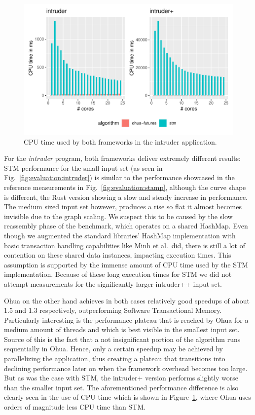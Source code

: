 \begin{figure}
    \centering
    \includegraphics[width=.66\textwidth,keepaspectratio]{gfx/results/cpu_intruder_comb}
    \caption{CPU time used by both frameworks in the intruder application.}%
    \label{fig:evaluation:intruder-cpu}
\end{figure}

For the \emph{intruder} program, both frameworks deliver extremely different results:
STM performance for the small input set (as seen in Fig.~\ref{fig:evaluation:intruder}) is similar to the performance showcased in the reference measurements in Fig.~\ref{fig:evaluation:stamp}, although the curve shape is different, the Rust version showing a slow and steady increase in performance.
The medium sized input set however, produces a rise so flat it almost becomes invisible due to the graph scaling.
We suspect this to be caused by the slow reassembly phase of the benchmark, which operates on a shared HashMap.
Even though we augmented the standard libraries' HashMap implementation with basic transaction handling capabilities like Minh et al.\ did, there is still a lot of contention on these shared data instances, impacting execution times.
This assumption is supported by the immense amount of CPU time used by the STM implementation.
Because of these long execution times for STM we did not attempt measurements for the significantly larger intruder++ input set.

Ohua on the other hand achieves in both cases relatively good speedups of about 1.5 and 1.3 respectively, outperforming Software Transactional Memory.
Particularly interesting is the performance plateau that is reached by Ohua for a medium amount of threads and which is best visible in the smallest input set.
Source of this is the fact that a not insignificant portion of the algorithm runs sequentially in Ohua.
Hence, only a certain speedup may be achieved by parallelizing the application, thus creating a plateau that transitions into declining performance later on when the framework overhead becomes too large.
But as was the case with STM, the intruder+ version performs slightly worse than the smaller input set.
The aforementioned performance difference is also clearly seen in the use of CPU time which is shown in Figure~\ref{fig:evaluation:intruder-cpu}, where Ohua uses orders of magnitude less CPU time than STM.


